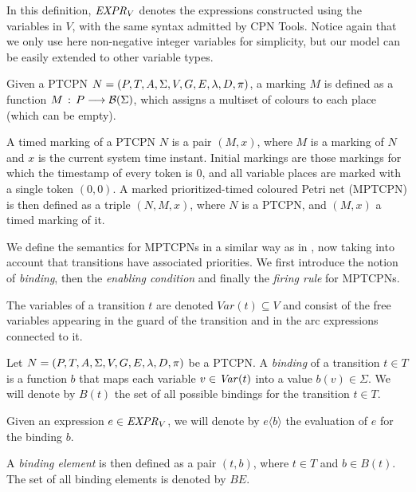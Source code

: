 \begin{definition} 
In this definition, ${\it EXPR}_V$ denotes the
expressions constructed using the variables in $V$,
with the same syntax admitted by CPN Tools. Notice again that we only use here non-negative integer variables for simplicity, but
our model can be easily extended to other variable types.
\end{definition}

\begin{definition} [(Markings)]
Given a PTCPN $N=(P,T,A,\Sigma,V,G,E,\lambda,D,\pi)$,
a marking $M$ is defined as a function
$M\,:\,P \longrightarrow {\cal B}(\Sigma)$,
which assigns a multiset of colours to each place
(which can be empty). 

A timed marking of a PTCPN $N$ is a pair $(M,x)$, where
$M$ is a marking of $N$ and $x$ is the current system time instant.
%
%
Initial markings are those markings for which
the timestamp of every token is $0$,
and all variable places are marked with a single
token $(0,0)$.
A marked prioritized-timed coloured Petri net (MPTCPN)
is then defined as a triple $(N,M,x)$, where
$N$ is a PTCPN, and $(M,x)$ a timed marking of it.
%
\end{definition}

We define the semantics for MPTCPNs in a similar way as in \cite{Jensen2009}, 
now taking into account that transitions have associated priorities.
We first introduce the notion of {\em binding}, then
the {\em enabling condition} and finally the {\em firing rule}
for MPTCPNs.

The variables of a transition $t$ are denoted $\mathit{Var(t)\subseteq V}$ and consist of the free variables
appearing in the guard of the transition and in the arc expressions connected to it.

\begin{definition} [(Bindings)]
Let $N=(P,T,A,\Sigma,V,G,E,\lambda,D,\pi)$ be a PTCPN.
A {\em binding} of a transition $t \in T$ is a function
$b$ that maps each variable $v \in {\it Var}(t)$
into a value $b(v) \in \Sigma$.
We will denote by $B(t)$ the set of all possible bindings
for the transition $t \in T$. 

Given an expression $e \in {\it EXPR}_V$, we will denote 
by $e\langle b \rangle$ the evaluation of $e$ for the
binding $b$.

A {\em binding element} is then defined as a pair
$(t,b)$, where $t \in T$ and $b \in B(t)$.
The set of all binding elements is denoted by $\mathit{BE}$.
\end{definition}

